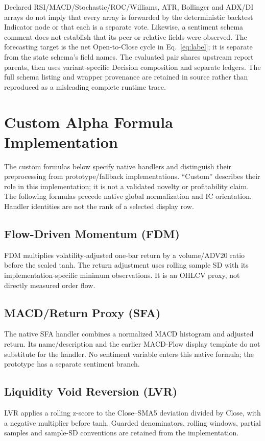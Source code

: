 Declared RSI/MACD/Stochastic/ROC/Williams, ATR, Bollinger and ADX/DI arrays do not imply that every array is forwarded by the deterministic backtest Indicator node or that each is a separate vote. Likewise, a sentiment schema comment does not establish that its peer or relative fields were observed. The forecasting target is the net Open-to-Close cycle in Eq.~\ref{eq:label}; it is separate from the state schema's field names. The evaluated pair shares upstream report parents, then uses variant-specific Decision composition and separate ledgers. The full schema listing and wrapper provenance are retained in source rather than reproduced as a misleading complete runtime trace.

\FloatBarrier
\setcounter{table}{0}
\section{Custom Alpha Formula Implementation}
\label{app:signals}
The custom formulas below specify native handlers and distinguish their preprocessing from prototype/fallback implementations. ``Custom'' describes their role in this implementation; it is not a validated novelty or profitability claim. The following formulas precede native global normalization and IC orientation. Handler identities are not the rank of a selected display row.


\subsection{Flow-Driven Momentum (FDM)}
FDM multiplies volatility-adjusted one-bar return by a volume/ADV20 ratio before the scaled tanh. The return adjustment uses rolling sample SD with its implementation-specific minimum observations. It is an OHLCV proxy, not directly measured order flow.

\subsection{MACD/Return Proxy (SFA)}
The native SFA handler combines a normalized MACD histogram and adjusted return. Its name/description and the earlier MACD-Flow display template do not substitute for the handler. No sentiment variable enters this native formula; the prototype has a separate sentiment branch.

\subsection{Liquidity Void Reversion (LVR)}
LVR applies a rolling z-score to the Close--SMA5 deviation divided by Close, with a negative multiplier before tanh. Guarded denominators, rolling windows, partial samples and sample-SD conventions are retained from the implementation.

